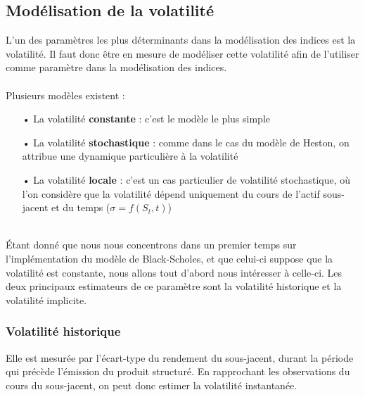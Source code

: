 \documentclass[french,12pt,a4paper]{article}
\begin{document}
\subsection{Modélisation de la volatilité}
L'un des paramètres les plus déterminants dans la modélisation des indices est la volatilité. Il faut donc être en mesure de modéliser cette volatilité afin de l'utiliser comme paramètre dans la modélisation des indices.\\ \\
Plusieurs modèles existent :
\begin{itemize}
\item[•] La volatilité \textbf{constante} : c'est le modèle le plus simple
\item[•] La volatilité \textbf{stochastique} : comme dans le cas du modèle de Heston, on attribue une dynamique particulière à la volatilité
\item[•] La volatilité \textbf{locale} : c'est un cas particulier de volatilité stochastique, où l'on considère que la volatilité dépend uniquement du cours de l'actif sous-jacent et du temps ($\sigma = f(S_{t},t)$)
\end{itemize}
\\
Étant donné que nous nous concentrons dans un premier temps sur l'implémentation du modèle de Black-Scholes, et que celui-ci suppose que la volatilité est constante, nous allons tout d'abord nous intéresser à celle-ci. Les deux principaux estimateurs de ce paramètre sont la volatilité historique et la volatilité implicite.

\subsubsection{Volatilité historique}
Elle est mesurée par l'écart-type du rendement du sous-jacent, durant la période qui précède l'émission du produit structuré. En rapprochant les observations du cours du sous-jacent, on peut donc estimer la volatilité instantanée.\\
\end{document}
